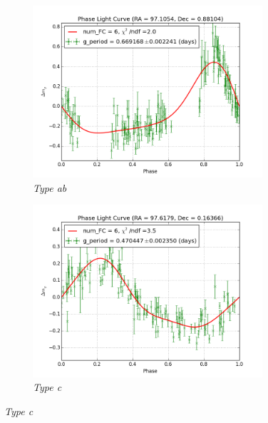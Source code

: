 \documentclass[aps,prb,twocolumn,superscriptaddress]{revtex4-1}
\begin{document}
\begin{figure}
	\centering
	\begin{subfigure}{.5\textwidth}
	  \centering
	  \includegraphics[width=3.35in]{figures/FSP1_g_LC_rrrtest_p5_grp19.png}
		\caption{\it \small{Type ab}}
		\label{fig:Tab}
	\end{subfigure}%
	\begin{subfigure}{.5\textwidth}
	  \centering
			\includegraphics[width=3.35in]{figures/FSP1_g_LC_rrrtest_p5_grp7.png}
		\caption{\it \small{Type c}}
		\label{fig:Tc}
	\end{subfigure}%
	

\end{figure}
\end{document}
